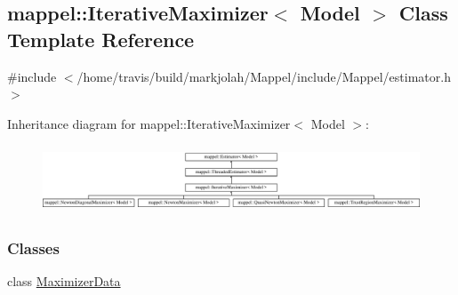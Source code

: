 \hypertarget{classmappel_1_1IterativeMaximizer}{}\subsection{mappel\+:\+:Iterative\+Maximizer$<$ Model $>$ Class Template Reference}
\label{classmappel_1_1IterativeMaximizer}


{\ttfamily \#include $<$/home/travis/build/markjolah/\+Mappel/include/\+Mappel/estimator.\+h$>$}

Inheritance diagram for mappel\+:\+:Iterative\+Maximizer$<$ Model $>$\+:\begin{figure}[H]
\begin{center}
\leavevmode
\includegraphics[height=2.043796cm]{classmappel_1_1IterativeMaximizer}
\end{center}
\end{figure}
\subsubsection*{Classes}
\begin{DoxyCompactItemize}
\item 
class \hyperlink{classmappel_1_1IterativeMaximizer_1_1MaximizerData}{Maximizer\+Data}
\end{DoxyCompactItemize}
